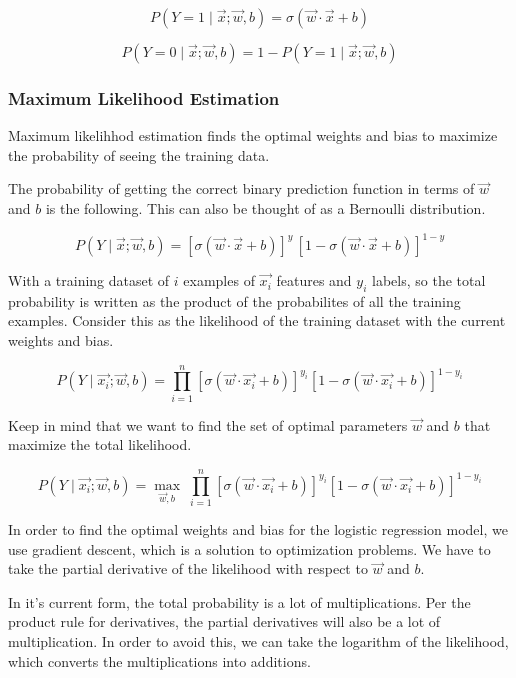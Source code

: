 \documentclass[11pt]{article}
\begin{document}
\[ P(Y=1 \mid \vec{x}; \vec{w}, b) = \sigma{(\vec{w} \cdot \vec{x} + b)}
\]

\[ P(Y=0 \mid \vec{x}; \vec{w}, b) = 1 - P(Y=1 \mid \vec{x}; \vec{w}, b)
\]

    \subsubsection{Maximum Likelihood
Estimation}\label{maximum-likelihood-estimation}

Maximum likelihhod estimation finds the optimal weights and bias to
maximize the probability of seeing the training data.

The probability of getting the correct binary prediction function in
terms of \(\vec{w}\) and \(b\) is the following. This can also be
thought of as a Bernoulli distribution.

\[
P(Y \mid \vec{x}; \vec{w}, b) =
\left[ \sigma(\vec{w} \cdot \vec{x} + b) \right]^{y} \,
\left[ 1 - \sigma(\vec{w} \cdot \vec{x} + b) \right]^{1 - y}
\]

With a training dataset of \(i\) examples of \(\vec{x_i}\) features and
\(y_i\) labels, so the total probability is written as the product of
the probabilites of all the training examples. Consider this as the
likelihood of the training dataset with the current weights and bias.

\[
P(Y \mid \vec{x_i}; \vec{w}, b) 
= \prod_{i=1}^{n}
\left[ \sigma(\vec{w} \cdot \vec{x_i} + b) \right]^{y_i}
\left[ 1 - \sigma(\vec{w} \cdot \vec{x_i} + b) \right]^{1 - y_i}
\]

Keep in mind that we want to find the set of optimal parameters
\(\vec{w}\) and \(b\) that maximize the total likelihood.

\[
P(Y \mid \vec{x_i}; \vec{w}, b) 
= \max_{\vec{w}, b} \;
\prod_{i=1}^{n}
\left[ \sigma(\vec{w} \cdot \vec{x_i} + b) \right]^{y_i}
\left[ 1 - \sigma(\vec{w} \cdot \vec{x_i} + b) \right]^{1 - y_i}
\]

    In order to find the optimal weights and bias for the logistic
regression model, we use gradient descent, which is a solution to
optimization problems. We have to take the partial derivative of the
likelihood with respect to \(\vec{w}\) and \(b\).

In it's current form, the total probability is a lot of multiplications.
Per the product rule for derivatives, the partial derivatives will also
be a lot of multiplication. In order to avoid this, we can take the
logarithm of the likelihood, which converts the multiplications into
additions.
\end{document}
